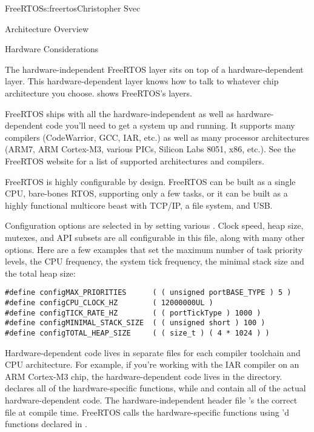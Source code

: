 \begin{aosachapter}{FreeRTOS}{s:freertos}{Christopher Svec}
\begin{aosasect1}{Architecture Overview}
\begin{aosaitemize}
\end{aosaitemize}

\begin{aosasect2}{Hardware Considerations}

The hardware-independent FreeRTOS layer sits on top of a
hardware-dependent layer.  This hardware-dependent layer knows how to
talk to whatever chip architecture you
choose.  shows FreeRTOS's layers.


FreeRTOS ships with all the hardware-independent as well as
hardware-dependent code you'll need to get a system up and running. It
supports many compilers (CodeWarrior, GCC, IAR, etc.) as well as many
processor architectures (ARM7, ARM Cortex-M3, various PICs, Silicon
Labs 8051, x86, etc.). See the FreeRTOS website for a list of supported
architectures and compilers.

FreeRTOS is highly configurable by design. FreeRTOS can be built as a
single CPU, bare-bones RTOS, supporting only a few
tasks, or it can be built as a highly functional multicore beast with
TCP/IP, a file system, and USB.

Configuration options are selected in  by
setting various . Clock speed, heap size, mutexes, and
API subsets are all configurable in this file, along with many other
options. Here are a few examples that set the maximum number of task
priority levels, the CPU frequency, the system tick frequency, the
minimal stack size and the total heap size:

\begin{verbatim}
#define configMAX_PRIORITIES      ( ( unsigned portBASE_TYPE ) 5 )
#define configCPU_CLOCK_HZ        ( 12000000UL )
#define configTICK_RATE_HZ        ( ( portTickType ) 1000 )
#define configMINIMAL_STACK_SIZE  ( ( unsigned short ) 100 )
#define configTOTAL_HEAP_SIZE     ( ( size_t ) ( 4 * 1024 ) )
\end{verbatim}

Hardware-dependent code lives in separate files for each compiler
toolchain and CPU architecture. For example, if you're working with
the IAR compiler on an ARM Cortex-M3 chip, the hardware-dependent code
lives in the  directory.
 declares all of the hardware-specific functions,
while  and  contain all of the actual
hardware-dependent code. The hardware-independent header file
 's the correct 
file at compile time.  FreeRTOS calls the hardware-specific functions
using 'd functions declared in .


\end{aosasect2}
\end{aosasect1}
\end{aosachapter}

